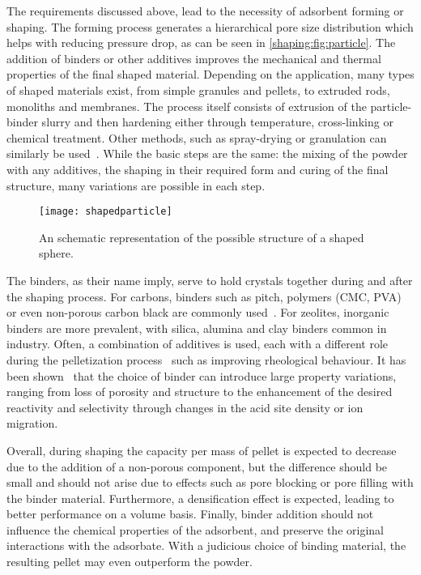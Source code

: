 The requirements discussed above, lead to the necessity of adsorbent
forming or shaping. The forming process generates a hierarchical pore size 
distribution which helps with reducing pressure drop, as can be
seen in \autoref{shaping:fig:particle}. The addition of 
binders or other additives improves the mechanical and thermal
properties of the final shaped material. Depending on the application,
many types of shaped materials exist, from simple granules and 
pellets, to extruded rods, monoliths and membranes.
The process itself consists of extrusion of the particle-binder slurry 
and then hardening either through temperature, cross-linking
or chemical treatment. Other methods, such as spray-drying or 
granulation can similarly be 
used~\cite{ruthvenPrinciplesAdsorptionAdsorption1984}.
While the basic steps are the same: the mixing of the powder with any
additives, the shaping in their required form and curing of the final
structure, many variations are possible in each step.

\begin{figure}[!htb]
	\centering
	\texttt{[image: shapedparticle]}
	\caption{An schematic representation of the possible structure
	of a shaped sphere.}%
	\label{shaping:fig:particle}
\end{figure}

The binders, as their name imply, serve to hold crystals together
during and after the shaping process.
For carbons, binders such as pitch, polymers (CMC, PVA) or 
even non-porous carbon black are 
commonly used~\cite{ohjiAdvancedProcessingManufacturing2008}.
For zeolites, inorganic binders are more prevalent, with silica, 
alumina and clay binders common in industry. 
Often, a combination of additives is used, each with a different role 
during the pelletization process~\cite{bandoszActivatedCarbonSurfaces2006}
such as improving rheological behaviour. It has been 
shown~\cite{whitingcuriouscasezeolite2016, MichelsEffectsBindersPerformance2014}
that the choice of binder can introduce large property variations, ranging 
from loss of porosity and structure to the enhancement of the desired
reactivity and selectivity through changes in the acid site density 
or ion migration.

Overall, during shaping the capacity per mass of pellet is expected to 
decrease due to the addition of a non-porous component, but the
difference should be small and should not arise due to effects 
such as pore blocking or pore filling with the binder material.
Furthermore, a densification effect is expected, leading to
better performance on a volume basis.
Finally, binder addition should not influence the chemical properties 
of the adsorbent, and preserve the original interactions with the adsorbate.
With a judicious choice of binding material, the resulting pellet
may even outperform the powder.

